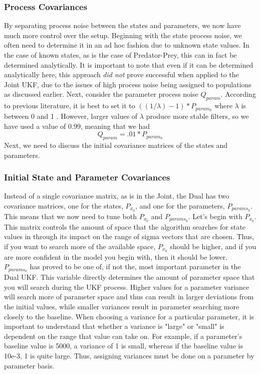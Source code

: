 \documentclass{article}
\begin{document}
\subsubsection{Process Covariances}
By separating process noise between the states and parameters, we now have much more control over the setup. Beginning with the state process noise, we often need to determine it in an ad hoc fashion due to unknown state values. In the case of known states, as is the case of Predator-Prey, this can in fact be determined analytically. It is important to note that even if it can be determined analytically here, this approach \emph{did not} prove successful when applied to the Joint UKF, due to the issues of high process noise being assigned to populations as discussed earlier. Next, consider the parameter process noise $Q_{param}$. According to previous literature,
it is best to set it to $((1/\lambda) - 1) * P_{param_0}$ where $\lambda$ is between 0 and 1 \cite{GoveHollingerDual}. However, larger values of $\lambda$ produce more stable filters, so we have used a value of 0.99, meaning that we had
\begin{equation}
Q_{param} = .01 * P_{param_0}
\end{equation}\cite{GoveHollingerDual}
 Next, we need to discuss the initial covariance matrices of the states and parameters.

\subsubsection{Initial State and Parameter Covariances}
Instead of a single covariance matrix, as is in the Joint, the Dual has two covariance matrices, one for the states, $P_{x_0}$,  and one for the parameters, $P_{params_0}$. This means that we now need to tune both $P_{x_0}$ and $P_{params_0}$. Let's begin with $P_{x_0}$. This matrix controls the amount of space that the algorithm searches for state values in through its impact on the range of sigma vectors that are chosen. Thus, if you want to search more of the available space, $P_{x_0}$ should be higher, and if you are more confident in the model you begin with, then it should be lower.
\\
$P_{params_0}$ has proved to be one of, if not the, most important parameter in the Dual UKF. This variable directly determines the amount of parameter space that you will search during the UKF process. Higher values for a parameter variance will search more of parameter space and thus can result in larger deviations from the initial values, while smaller variances result in parameter searching more closely to the baseline. When choosing a variance for a particular parameter, it is important to understand that whether a variance is "large" or "small" is dependent on the range that value can take on. For example, if a parameter's baseline value is 5000, a variance of 1 is small, whereas if the baseline value is 10e-3, 1 is quite large. Thus, assigning variances must be done on a parameter by parameter basis. 
\end{document}
